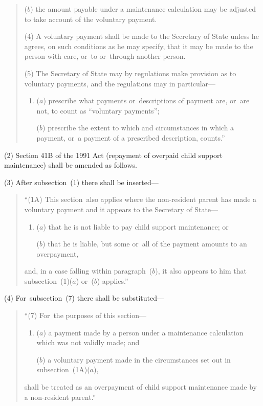 \documentclass[12pt,a4paper]{article}
\begin{document}
\begin{quotation}
\begin{enumerate}
($b$) the amount payable under a maintenance calculation may be adjusted to take account of the voluntary payment.
\end{enumerate}

(4) A voluntary payment shall be made to the Secretary of State unless he agrees, on such conditions as he may specify, that it may be made to the person with care, or~to or~through another person.

(5) The Secretary of State may by regulations make provision as to voluntary payments, and the regulations may in particular—
\begin{enumerate}\item[]
($a$) prescribe what payments or~descriptions of payment are, or~are not, to count as “voluntary payments”;

($b$) prescribe the extent to which and circumstances in which a payment, or~a payment of a prescribed description, counts.”
\end{enumerate}
\end{quotation}

(2) Section 41B of the 1991 Act (repayment of overpaid child support maintenance) shall be amended as follows.

(3) After subsection~(1)  there shall be inserted—
\begin{quotation}
“(1A) This section~also applies where the non-resident parent has made a voluntary payment and it appears to the Secretary of State—
\begin{enumerate}\item[]
($a$) that he is not liable to pay child support maintenance; or

($b$) that he is liable, but some or~all of the payment amounts to an overpayment,
\end{enumerate}
and, in a case falling within paragraph~($b$), it also appears to him that subsection~(1)($a$)  or~($b$)  applies.”
\end{quotation}

(4) For~subsection~(7)  there shall be substituted—
\begin{quotation}
“(7) For~the purposes of this section—
\begin{enumerate}\item[]
($a$) a payment made by a person under a maintenance calculation which was not validly made; and

($b$) a voluntary payment made in the circumstances set out in subsection~(1A)($a$),
\end{enumerate}
shall be treated as an overpayment of child support maintenance made by a non-resident parent.”
\end{quotation}
\end{document}
